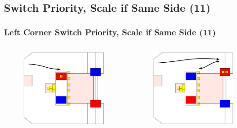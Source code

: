 \documentclass{beamer}
\begin{document}
\subsection{Switch Priority, Scale if Same Side (11)}

\begin{frame}
 \frametitle{Left Corner Switch Priority, Scale if Same Side \alert{(11)}}
 \begin{columns}
  \begin{figure}
   \includegraphics[scale=0.15]{assets/paths/11_LR}
  \end{figure}
  \begin{figure}
   \includegraphics[scale=0.15]{assets/paths/11_RL}

\end{figure}
\end{columns}
\end{frame}
\end{document}

